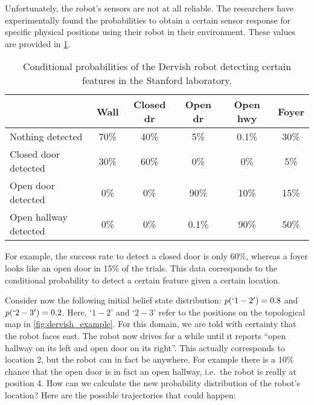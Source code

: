 Unfortunately, the robot's sensors are not at all reliable. The researchers have experimentally found the probabilities to obtain a certain sensor response for specific physical positions using their robot in their environment. These values are provided in \cref{tab:dervish_example}.

\begin{table}
\footnotesize
\begin{tabular}{lccccc}
 	& Wall	& Closed dr & Open dr	& Open hwy & Foyer\\
\hline
Nothing detected	& 70\%	& 40\%&	5\%	& 0.1\% & 30\%\\
Closed door detected & 30\% &	60\%& 0\% &0\%	& 5\%\\
Open door detected & 0\%	& 0\%&	90\% & 10\% & 15\%\\
Open hallway detected & 0\% &	 0\%&	0.1\% & 90\% &50\%\\
\hline
\end{tabular}
\normalsize
\caption{Conditional probabilities of the Dervish robot detecting certain features in the Stanford laboratory.\label{tab:dervish_example}}
\end{table}

For example, the success rate to detect a closed door is only 60\%, whereas a foyer looks like an open door in 15\% of the trials. This data corresponds to the conditional probability to detect a certain feature given a certain location.

Consider now the following initial belief state distribution: $p(`1-2')=0.8$ and $p(`2-3')=0.2$. Here, `$1-2$' and `$2-3$' refer to the positions on the topological map in \cref{fig:dervish_example}. For this domain, we are told with certainty that the robot faces east. The robot now drives for a while until it reports ``open hallway on its left and open door on its right''. This actually corresponds to location 2, but the robot can in fact be anywhere. For example there is a 10\% chance that the open door is in fact an open hallway, i.e.\ the robot is really at position 4. How can we calculate the new probability distribution of the robot's location? Here are the possible trajectories that could happen:

